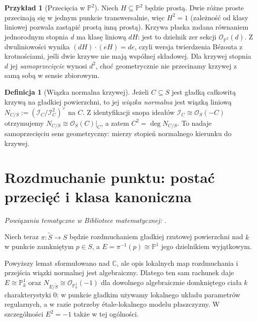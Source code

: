 \documentclass[11pt,a4paper,openany]{report}
\numberwithin{equation}{section}
\theoremstyle{plain}
\theoremstyle{definition}
\newtheorem{definicja}[twierdzenie]{Definicja}
\newtheorem{przyklad}[twierdzenie]{Przykład}
\theoremstyle{remark}
\newcommand{\C}{\mathbb C}
\newcommand{\PP}{\mathbb P}
\begin{document}
\begin{przyklad}[Przecięcia w $\PP^2$]
\label{prz:ga6-p2}
Niech $H\subseteq\PP^2$ będzie prostą. Dwie różne proste
przecinają się w jednym punkcie transwersalnie,
więc $H^2=1$ (zależność od klasy liniowej pozwala zastąpić
prostą inną prostą). Krzywa płaska zadana równaniem jednorodnym
stopnia $d$ ma klasę liniową $dH$: jest to dzielnik zer
sekcji $\mathcal O_{\PP^2}(d)$. Z dwuliniowości wynika
$(dH)\cdot(eH)=de$, czyli wersja twierdzenia Bézouta
z krotnościami, jeśli dwie krzywe nie mają wspólnej składowej.
Dla krzywej stopnia $d$ jej \emph{samoprzecięcie} wynosi $d^2$,
choć geometrycznie nie przecinamy krzywej z samą sobą
w sensie zbiorowym.
\end{przyklad}

\begin{definicja}[Wiązka normalna krzywej]
Jeżeli $C\subseteq S$ jest gładką całkowitą krzywą
na gładkiej powierzchni, to jej \emph{wiązka normalna}
jest wiązką liniową
$N_{C/S}:=(\mathcal I_C/\mathcal I_C^2)^\vee$ na $C$.
Z identyfikacji snopa ideałów $\mathcal I_C\cong\mathcal O_S(-C)$
otrzymujemy $N_{C/S}\cong\mathcal O_S(C)|_C$, a zatem
$C^2=\deg N_{C/S}$. To nadaje samoprzecięciu sens
geometryczny: mierzy stopień normalnego kierunku do krzywej.
\end{definicja}

\section{Rozdmuchanie punktu: postać przecięć i klasa kanoniczna}
\label{sec:ga6-blowup}

\noindent\emph{Powiązania tematyczne w Bibliotece matematycznej:} .


Niech teraz $\pi:\widetilde S\to S$ będzie rozdmuchaniem
gładkiej rzutowej powierzchni nad $k$ w punkcie
zamkniętym $p\in S$,
a $E=\pi^{-1}(p)\cong\PP^1$ jego dzielnikiem wyjątkowym.



Powyższy lemat sformułowano nad $\C$, ale opis lokalnych map
rozdmuchania i przejścia wiązki normalnej jest algebraiczny.
Dlatego ten sam rachunek daje $E\cong\PP^1_k$ oraz
$N_{E/\widetilde S}\cong\mathcal O_{\PP^1_k}(-1)$
dla dowolnego algebraicznie domkniętego ciała $k$
charakterystyki $0$: w punkcie gładkim używamy
lokalnego układu parametrów regularnych, a w razie
potrzeby étale-lokalnego modelu płaszczyzny.
W szczególności $E^2=-1$ także w tej ogólności.
\end{document}
